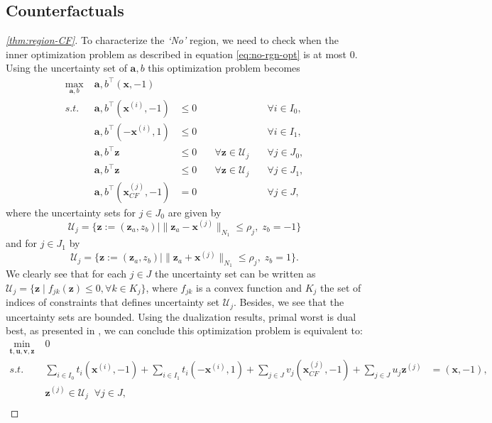 \documentclass{article}
\begin{document}
{\subsection{Counterfactuals}\label{app:proofs_counterfactuals}
\begin{proof}[\cref{thm:region-CF}]
To characterize the \textit{`No'} region, we need to check when the inner optimization problem as described in equation \ref{eq:no-rgn-opt} is at most 0. Using the uncertainty set of $\bm{a},b$ this optimization problem becomes
$$\begin{array}{lrlcl}
\underset{\bm{a},b}{\max}& \;\bm{a},b^{\top}(\bm{x},-1)\\
 s.t.&\;  \bm{a},b^{\top}(\bm{x}^{(i)},-1)&\leq 0 & &\quad\forall i \in I_{0},  \\
&\;  \bm{a},b^{\top}(-\bm{x}^{(i)},1) &\leq 0  &\quad&\quad\forall i \in I_1, \\
&\;  \bm{a},b^{\top}\bm{z}&\leq 0  &\quad \forall \bm{z} \in\mathcal{U}_j &\quad \forall j \in J_{0}, \\ 
&\;  \bm{a},b^{\top}\bm{z} &\leq 0 &\quad
  \forall \bm{z} \in\mathcal{U}_j&\quad \forall j \in J_1, \\
&\;  \bm{a},b^{\top}(\bm{x}_{CF}^{(j)}, -1) &= 0  &\quad&\quad\forall j \in J,
\end{array}$$
where the uncertainty sets for $j\in J_{0}$ are given by 
\[
\mathcal{U}_j=\{\bm{z}:=(\bm{z}_a,z_b)\mid\| \bm{z}_a - \bm{x}^{(j)}\|_{N_1} \leq \rho_j,\; z_b=-1\}\]
and for $j\in J_1$ by
\[\mathcal{U}_j=\{\bm{z}:=(\bm{z}_a,z_b)\mid \|\bm{z}_a + \bm{x}^{(j)}\|_{N_1} \leq \rho_j,\; z_b=1\}.
\]
We clearly see that for each $j\in J$ the uncertainty set can be written as 
$\mathcal{U}_j=\{\bm{z}\mid f_{jk}(\bm{z})\leq 0, \forall k\in K_j\}$, where $f_{jk}$ is a convex function and $K_j$ the set of indices of constraints that defines uncertainty set $\mathcal{U}_j$. Besides, we see that the uncertainty sets are bounded.
Using the dualization results, primal worst is dual best, as presented in \citet[equation (2.45)]{bertsimas_robust_2022}, we can conclude this optimization problem is equivalent to:
$$\begin{array}{lllll}
\underset{\bm{t,u,v,z}}{\min}& \;0\\
 s.t.&\;  \sum\limits_{i \in I_{0}}t_{i}(\bm{x}^{(i)},-1)+\sum\limits_{i \in I_1}t_{i}(-\bm{x}^{(i)},1) +\sum\limits_{j\in J}v_j (\bm{x}_{CF}^{(j)},-1)+\sum\limits_{j\in J}u_j\bm{z}^{(j)}&=(\bm{x},-1),\\
 &\;\bm{z}^{(j)}\in\mathcal{U}_j\;\;\forall j\in J,\\

\end{array}$$
\end{proof}}
\end{document}
